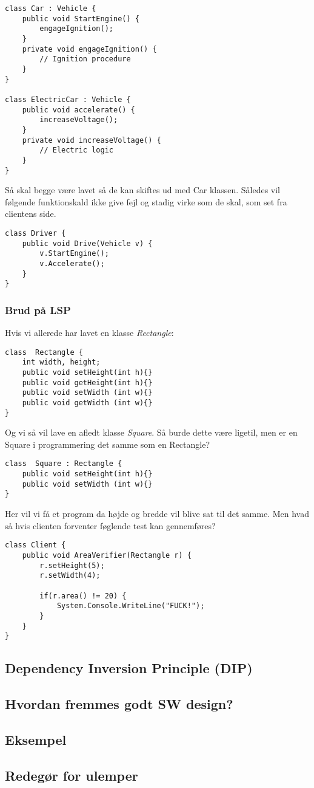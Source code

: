\begin{lstlisting}
class Car : Vehicle {
	public void StartEngine() {
		engageIgnition();
	}
	private void engageIgnition() {
		// Ignition procedure
	}
}

class ElectricCar : Vehicle {
	public void accelerate() {
		increaseVoltage();
	}
	private void increaseVoltage() {
		// Electric logic
	}
}
\end{lstlisting}

Så skal begge være lavet så de kan skiftes ud med Car klassen. Således vil følgende funktionskald ikke give fejl og stadig virke som de skal, som set fra clientens side.

\begin{lstlisting}
class Driver {
	public void Drive(Vehicle v) {
		v.StartEngine();
		v.Accelerate();
	}
}
\end{lstlisting}

\subsubsection{Brud på LSP}
Hvis vi allerede har lavet en klasse \textit{Rectangle}:

\begin{lstlisting}
class  Rectangle {
	int width, height;
	public void setHeight(int h){}
	public void getHeight(int h){}
	public void setWidth (int w){}
	public void getWidth (int w){}
}
\end{lstlisting}

Og vi så vil lave en afledt klasse \textit{Square}. Så burde dette være ligetil, men er en Square i programmering det samme som en Rectangle?

\begin{lstlisting}
class  Square : Rectangle {
	public void setHeight(int h){}
	public void setWidth (int w){}
}
\end{lstlisting}

Her vil vi få et program da højde og bredde vil blive sat til det samme. Men hvad så hvis clienten forventer føglende test kan gennemføres?

\begin{lstlisting}
class Client {
	public void AreaVerifier(Rectangle r) {
		r.setHeight(5);
		r.setWidth(4);
		
		if(r.area() != 20) {
			System.Console.WriteLine("FUCK!");
		}
	}
}
\end{lstlisting}



\subsection{Dependency Inversion Principle (DIP)}

\subsection{Hvordan fremmes godt SW design?}

\subsection{Eksempel}

\subsection{Redegør for ulemper}